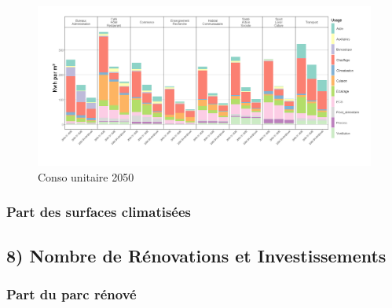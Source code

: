 \documentclass[]{article}
\begin{document}
\begin{figure}
\centering
\includegraphics{Exemple_sortiestertiaire_files/figure-latex/Conso_u_branche_2050-1.png}
\caption{Conso unitaire 2050}
\end{figure}

\clearpage
\newpage

\subsubsection{Part des surfaces
climatisées}\label{part-des-surfaces-climatisees}

\clearpage
\newpage

\subsection{8) Nombre de Rénovations et
Investissements}\label{nombre-de-renovations-et-investissements}

\subsubsection{Part du parc rénové}\label{part-du-parc-renove}
\end{document}
